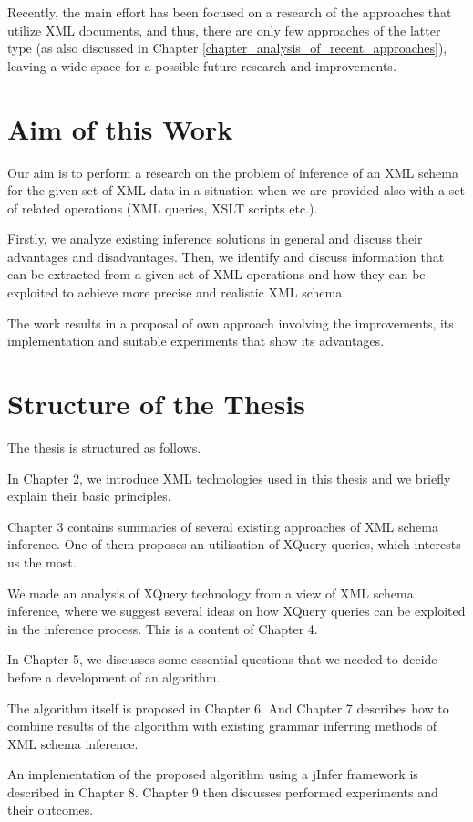 Recently, the main effort has been focused on a research of the approaches that utilize XML documents, and thus, there are only few approaches of the latter type (as also discussed in Chapter \ref{chapter_analysis_of_recent_approaches}), leaving a wide space for a possible future research and improvements.

\section{Aim of this Work}
Our aim is to perform a research on the problem of inference of an XML schema for the given set of XML data in a situation when we are provided also with a set of related operations (XML queries, XSLT scripts \cite{Clark:99:XTV} etc.).

Firstly, we analyze existing inference solutions in general and discuss their advantages and disadvantages. Then, we identify and discuss information that can be extracted from a given set of XML operations and how they can be exploited to achieve more precise and realistic XML schema.

The work results in a proposal of own approach involving the improvements, its implementation and suitable experiments that show its advantages.

\section{Structure of the Thesis}
The thesis is structured as follows.

In Chapter 2, we introduce XML technologies used in this thesis and we briefly explain their basic principles.

Chapter 3 contains summaries of several existing approaches of XML schema inference. One of them proposes an utilisation of XQuery queries, which interests us the most.

We made an analysis of XQuery technology from a view of XML schema inference, where we suggest several ideas on how XQuery queries can be exploited in the inference process. This is a content of Chapter 4.

In Chapter 5, we discusses some essential questions that we needed to decide before a development of an algorithm.

The algorithm itself is proposed in Chapter 6. And Chapter 7 describes how to combine results of the algorithm with existing grammar inferring methods of XML schema inference.

An implementation of the proposed algorithm using a jInfer framework is described in Chapter 8. Chapter 9 then discusses performed experiments and their outcomes.
